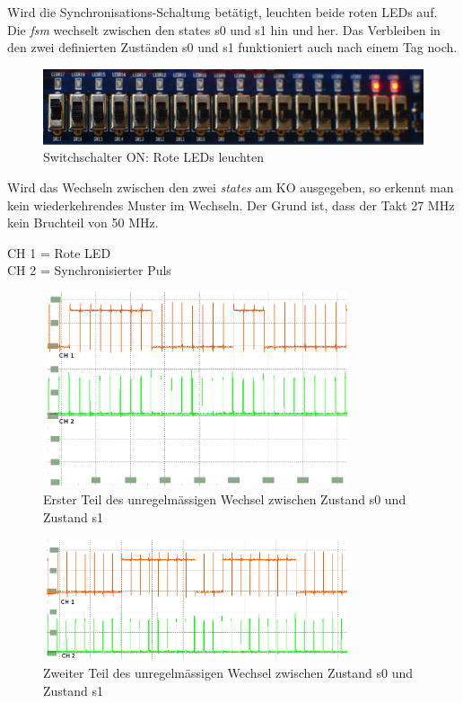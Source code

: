 Wird die Synchronisations-Schaltung betätigt, leuchten beide roten LEDs auf. Die \textit{fsm} wechselt zwischen den states s0 und s1 hin und her. Das Verbleiben in den zwei definierten Zuständen s0 und s1 funktioniert auch nach einem Tag noch.

\begin{figure}[H]
	\includegraphics[width=1\textwidth]{images/metastability/synchronized.JPG}
	\caption{Switchschalter ON: Rote LEDs leuchten}
	\label{fig.metastabil.Ergebnis_BoardSynchron}
\end{figure}

\newpage
Wird das Wechseln zwischen den zwei \textit{states} am KO ausgegeben, so erkennt man kein wiederkehrendes Muster im Wechseln. Der Grund ist, dass der Takt 27 MHz kein Bruchteil von 50 MHz.

CH 1 = Rote LED\\
CH 2 = Synchronisierter Puls

\begin{figure}[H]
	\includegraphics[width=0.8\textwidth]{images/metastability/synchron_eng_2.png}
	\caption{Erster Teil des unregelmässigen Wechsel zwischen Zustand s0 und Zustand s1}
	\label{fig.metastabil.Ergebnis_1}
\end{figure}

\begin{figure}[H]
	\includegraphics[width=0.8\textwidth]{images/metastability/synchron_eng_3.png}
	\caption{Zweiter Teil des unregelmässigen Wechsel zwischen Zustand s0 und Zustand s1}
	\label{fig.metastabil.Ergebnis_2}
\end{figure}

